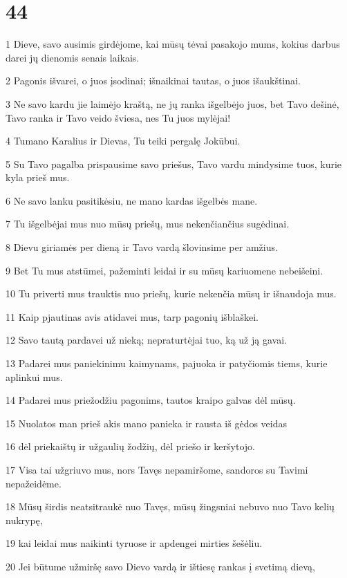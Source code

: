 \chapter{44}


\par 1 Dieve, savo ausimis girdėjome, kai mūsų tėvai pasakojo mums, kokius darbus darei jų dienomis senais laikais. 
\par 2 Pagonis išvarei, o juos įsodinai; išnaikinai tautas, o juos išaukštinai. 
\par 3 Ne savo kardu jie laimėjo kraštą, ne jų ranka išgelbėjo juos, bet Tavo dešinė, Tavo ranka ir Tavo veido šviesa, nes Tu juos mylėjai! 
\par 4 Tu­mano Karalius ir Dievas, Tu teiki pergalę Jokūbui. 
\par 5 Su Tavo pagalba prispausime savo priešus, Tavo vardu mindysime tuos, kurie kyla prieš mus. 
\par 6 Ne savo lanku pasitikėsiu, ne mano kardas išgelbės mane. 
\par 7 Tu išgelbėjai mus nuo mūsų priešų, mus nekenčiančius sugėdinai. 
\par 8 Dievu giriamės per dieną ir Tavo vardą šlovinsime per amžius. 
\par 9 Bet Tu mus atstūmei, pažeminti leidai ir su mūsų kariuomene nebeišeini. 
\par 10 Tu priverti mus trauktis nuo priešų, kurie nekenčia mūsų ir išnaudoja mus. 
\par 11 Kaip pjautinas avis atidavei mus, tarp pagonių išblaškei. 
\par 12 Savo tautą pardavei už nieką; nepraturtėjai tuo, ką už ją gavai. 
\par 13 Padarei mus paniekinimu kaimynams, pajuoka ir patyčiomis tiems, kurie aplinkui mus. 
\par 14 Padarei mus priežodžiu pagonims, tautos kraipo galvas dėl mūsų. 
\par 15 Nuolatos man prieš akis mano panieka ir rausta iš gėdos veidas 
\par 16 dėl priekaištų ir užgaulių žodžių, dėl priešo ir keršytojo. 
\par 17 Visa tai užgriuvo mus, nors Tavęs nepamiršome, sandoros su Tavimi nepažeidėme. 
\par 18 Mūsų širdis neatsitraukė nuo Tavęs, mūsų žingsniai nebuvo nuo Tavo kelių nukrypę, 
\par 19 kai leidai mus naikinti tyruose ir apdengei mirties šešėliu. 
\par 20 Jei būtume užmiršę savo Dievo vardą ir ištiesę rankas į svetimą dievą, 
